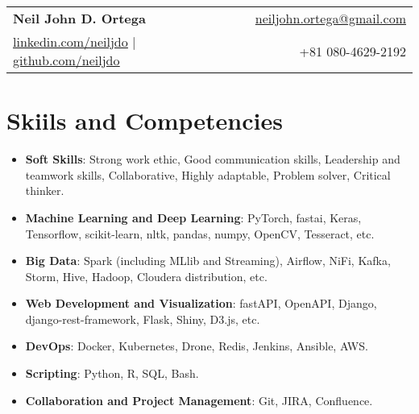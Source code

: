 \documentclass[letterpaper,11pt]{article}
\newcommand{\resumeItemInline}[2]{
  \item\small{
    \textbf{#1}{: #2 \vspace{-2pt}}
  }
}
\newcommand{\resumeSubItemInline}[2]{\resumeItemInline{#1}{#2}\vspace{-6pt}}
\newcommand{\resumeSubHeadingListStart}{\begin{itemize}[leftmargin=*]}
\newcommand{\resumeSubHeadingListEnd}{\end{itemize}\vspace{-5pt}}
\begin{document}
\begin{tabular*}{\textwidth}{l@{\extracolsep{\fill}}r}
  \textbf{{\Large Neil John D. Ortega}} & \href{mailto:neiljohn.ortega@gmail.com}{neiljohn.ortega@gmail.com}\\
  \href{https://linkedin.com/neiljdo}{\underline{linkedin.com/neiljdo}} | \href{https://github.com/neiljdo}{\underline{github.com/neiljdo}} & +81 080-4629-2192\\
\end{tabular*}


\section{Skiils and Competencies}
  \resumeSubHeadingListStart
    \resumeSubItemInline{Soft Skills}
      {Strong work ethic, Good communication skills, Leadership and teamwork skills, Collaborative, Highly adaptable, Problem solver, Critical thinker.}
    \resumeSubItemInline{Machine Learning and Deep Learning}
      {PyTorch, fastai, Keras, Tensorflow, scikit-learn, nltk, pandas, numpy, OpenCV, Tesseract, etc.}
    \resumeSubItemInline{Big Data}
      {Spark (including MLlib and Streaming), Airflow, NiFi, Kafka, Storm, Hive, Hadoop, Cloudera distribution, etc.}
    \resumeSubItemInline{Web Development and Visualization}
      {fastAPI, OpenAPI, Django, django-rest-framework, Flask, Shiny, D3.js, etc.}
    \resumeSubItemInline{DevOps}
      {Docker, Kubernetes, Drone, Redis, Jenkins, Ansible, AWS.}
    \resumeSubItemInline{Scripting}
      {Python, R, SQL, Bash.}
    \resumeSubItemInline{Collaboration and Project Management}
      {Git, JIRA, Confluence.}
  \resumeSubHeadingListEnd


\end{document}
